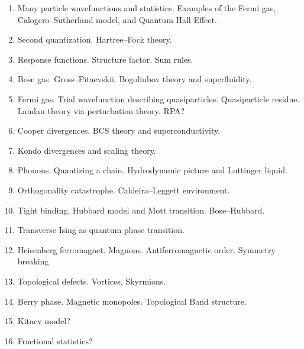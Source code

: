 \begin{enumerate}
\item Many particle wavefunctions and statistics. Examples of the Fermi gas, Calogero--Sutherland model, and Quantum Hall Effect.

\item Second quantization. Hartree--Fock theory.

\item Response functions. Structure factor. Sum rules. 

\item Bose gas. Gross--Pitaevskii. Bogoliubov theory and superfluidity.

\item Fermi gas. Trial wavefunction describing quasiparticles. Quasiparticle residue. Landau theory via perturbation theory. RPA?

\item Cooper divergences. BCS theory and superconductivity. 

\item Kondo divergences and scaling theory.

\item Phonons. Quantizing a chain. Hydrodynamic picture and Luttinger liquid.

\item Orthogonality catastrophe. Caldeira--Leggett environment.

\item Tight binding. Hubbard model and Mott transition. Bose--Hubbard.

\item Transverse Ising as quantum phase transition.

\item Heisenberg ferromagnet. Magnons. Antiferromagnetic order. Symmetry breaking

\item Topological defects. Vortices, Skyrmions. 

\item Berry phase. Magnetic monopoles. Topological Band structure.

\item Kitaev model?

\item Fractional statistics?
\end{enumerate}